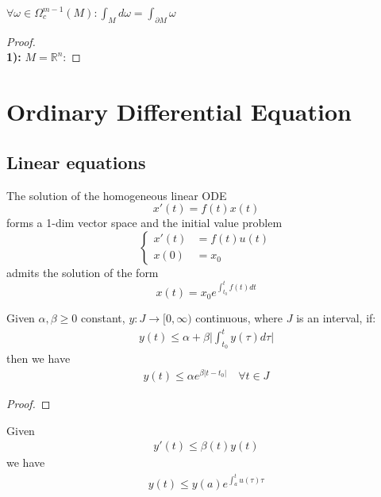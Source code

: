 \begin{theorem}
	$\forall \omega \in \Omega_c^{m -1}(M): \int_M d\omega  = \int_{\partial M} \omega $
\end{theorem}
\begin{proof}
	\quad\\
	\textbf{1):} $M = \mathbb{R}^n$: 
\end{proof}


\section{Ordinary Differential Equation}
\subsection{Linear equations}
\begin{theorem}
	The solution of the homogeneous linear ODE
	\begin{equation*}
		x'(t) = f(t)x(t)
	\end{equation*}
	forms a 1-dim vector space and the initial value problem
	\begin{equation*}
	\left\{
	\begin{aligned}
		x'(t) &= f(t)u(t)\\
		x(0) &= x_0
	\end{aligned}
	\right.
	\end{equation*}
	admits the solution of the form
	\begin{equation*}
		x(t) = x_0 e^{\int_{t_0}^{t} f(t) dt} 
	\end{equation*}
\end{theorem}

\begin{lemma}
Given $\alpha, \beta \ge 0$ constant, $y: J \rightarrow [0, \infty)$ continuous, where $J$ is an interval, if:
\begin{align*}
	y(t) \le \alpha + \beta \bigg| \int_{t_0}^t y(\tau) d\tau \bigg|
\end{align*}
then we have
\begin{align*}
	y(t) \le \alpha e^{\beta | t - t_0|} \quad \forall t \in J
\end{align*}
\end{lemma}
\begin{proof}
\end{proof}

\begin{corollary}
	Given 
	\begin{align*}
		y'(t) \le \beta(t) y(t)
	\end{align*}
	we have
	\begin{align*}
		y(t) \le y(a) e^{\int_a^t u(\tau) \tau}
	\end{align*}
\end{corollary}

